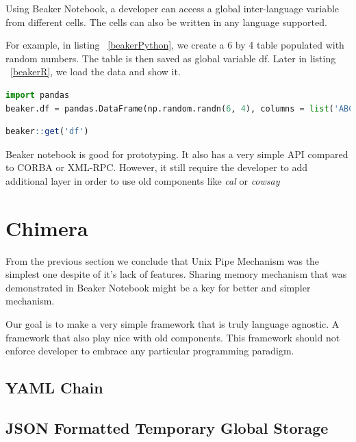 \documentclass[conference]{IEEEtran}
\begin{document}
Using Beaker Notebook, a developer can access a global inter-language variable
from different cells. The cells can also be written in any language supported.

For example, in listing ~\ref{beakerPython}, we create a 6 by 4 table populated with
random numbers. The table is then saved as global variable df. 
Later in listing ~\ref{beakerR}, we load the data and show it.

\begin{lstlisting}[caption=Beaker Python Cell Example, label=beakerPython, language=python, basicstyle=\small, breaklines=true]
import pandas
beaker.df = pandas.DataFrame(np.random.randn(6, 4), columns = list('ABCD'))
\end{lstlisting}

\begin{lstlisting}[caption=Beaker R Cell Example, label=beakerR, language=R, basicstyle=\small, breaklines=true]
beaker::get('df')
\end{lstlisting}

Beaker notebook is good for prototyping. It also has a very simple API compared to
CORBA or XML-RPC. However, it still require the developer to add additional layer
in order to use old components like {\it cal} or {\it cowsay}


\section{Chimera}

From the previous section we conclude that Unix Pipe Mechanism was the simplest one
despite of it's lack of features. Sharing memory mechanism that was demonstrated in
Beaker Notebook might be a key for better and simpler mechanism.

Our goal is to make a very simple framework that is truly language agnostic. A framework
that also play nice with old components. This framework should not enforce developer to
embrace any particular programming paradigm.

\subsection{YAML Chain}
\blindtext

\subsection{JSON Formatted Temporary Global Storage}
\blindtext
\end{document}
